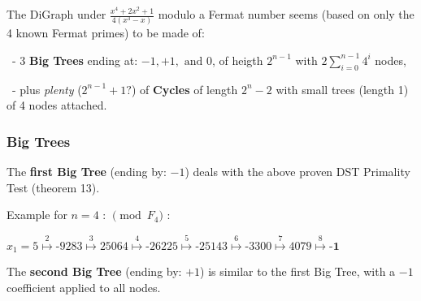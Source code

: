 \documentclass[latin1]{quadrature}
\newcommand{\PMod}[1]{\!\!\pmod{#1}}
\newif\ifenfrancais
\begin{document}
\begin{article}
\begin{article}
\ifenfrancais
Le DiGraph sous $\frac{\displaystyle x^4+2x^2+1}{\displaystyle 4(x^3-x)}$ modulo un nombre de Fermat semble (\`a partir des 4 seuls nombres de Fermat connus) avoir la structure suivante :
\else
The DiGraph under $\frac{\displaystyle x^4+2x^2+1}{\displaystyle 4(x^3-x)}$ modulo a Fermat number seems (based on only the 4 known Fermat primes) to be made of:
\fi

\vspace{.05in}
\ifenfrancais
\ - 3 \textbf{Arbres G\'eants} finissant par : $-1, +1, \text{ ou } 0$, de hauteur $2^{n-1}$ avec $2\sum_{i=0}^{n-1}4^i$ n\oe uds,
\else
\ - 3 \textbf{Big Trees} ending at: $-1, +1, \text{ and } 0$, of heigth $2^{n-1}$ with $2\sum_{i=0}^{n-1}4^i$ nodes,
\fi

\vspace{.05in}
\ifenfrancais
\  -  \emph{de nombreux} \textbf{Cycles}, dont $2^{n-1}+1$ cycles de longueur $2^n-2$ avec de petits arbres (de longueur 1) de 3 n\oe uds attach\'es.
\else
\  -  plus \emph{plenty} ($2^{n-1}+1 ?$) of \textbf{Cycles} of length $2^n-2$ with small trees (length 1) of 4 nodes attached.
\fi


\ifenfrancais
\subsubsection { Arbres G\'eants }
\else
\subsubsection { Big Trees }
\fi

\ifenfrancais
Le  \textbf{premier Arbre G\'eant} (finissant par : $-1$) est celui utilis\'e par le test de primalit\'e DST ci-dessus (th\'eor\`eme 13).
\else
The \textbf{first Big Tree} (ending by: $-1$) deals with the above proven DST Primality Test (theorem 13).
\fi

\ifenfrancais
Example pour $n=4$ : $\PMod{F_{4}}$ :
\else
Example for $n=4$ : $\PMod{F_{4}}$ :
\fi

$x_1 = 5
\stackrel{2}{\mapsto} \text{-9283}
\stackrel{3}{\mapsto} \text{25064}
\stackrel{4}{\mapsto} \text{-26225}
\stackrel{5}{\mapsto} \text{-25143}
\stackrel{6}{\mapsto} \text{-3300}
\stackrel{7}{\mapsto} \text{4079}
\stackrel{8}{\mapsto} \textbf{-1}$

\vspace{.1in}

\ifenfrancais
Le \textbf{second Arbre G\'eant} (finissant par : $+1$) est similaire au premier Arbre G\'eant, avec un coefficient $-1$ appliqu\'e \`a tous les n\oe uds.
\else
The \textbf{second Big Tree} (ending by: $+1$) is similar to the first Big Tree, with a $-1$ coefficient applied to all nodes.
\fi


\end{article}
\end{article}
\end{document}
